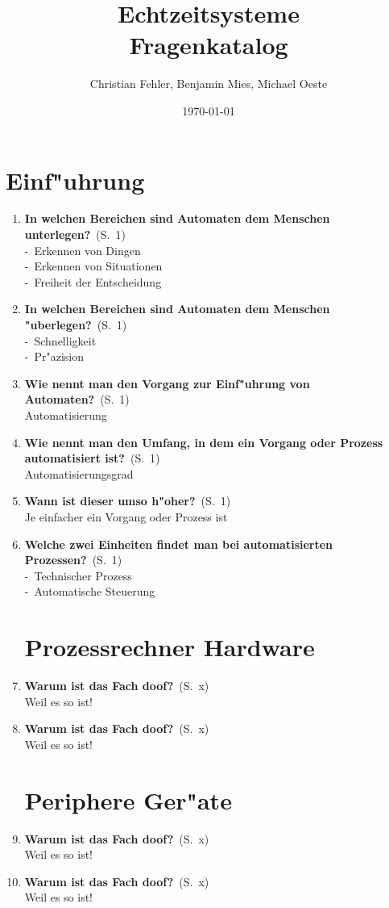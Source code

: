 \documentclass[a4paper,latin1,12pt]{article}
\title{{\Huge Echtzeitsysteme}\\Fragenkatalog}
\author{{\Large Christian Fehler, Benjamin Mies, Michael Oeste}}
\date{\small\today}
\newcommand{\question}[3]{\item {\textbf{#1?}}\ (S.\ #2)\\[2mm]#3}
\newcommand{\catchword}[1]{-\ #1\\}
\newcommand{\normaltext}[1]{#1\\}
\begin{document}
\maketitle
\newpage
\tableofcontents

\newpage
\section{Einf"uhrung}

\begin{enumerate}

  \question{In welchen Bereichen sind Automaten dem Menschen unterlegen}{1}
  {
    \catchword{Erkennen von Dingen}
    \catchword{Erkennen von Situationen}
    \catchword{Freiheit der Entscheidung}
  }

  \question{In welchen Bereichen sind Automaten dem Menschen "uberlegen}{1}
  {
    \catchword{Schnelligkeit}
    \catchword{Pr"azision}
  }

  \question{Wie nennt man den Vorgang zur Einf"uhrung von Automaten}{1}
  {
   \normaltext{Automatisierung}
  }

  \question{Wie nennt man den Umfang, in dem ein Vorgang oder Prozess automatisiert ist}{1}
  {
    \normaltext{Automatisierungsgrad}
  }

  \question{Wann ist dieser umso h"oher}{1}
  {
    \normaltext{Je einfacher ein Vorgang oder Prozess ist}
  }

  \question{Welche zwei Einheiten findet man bei automatisierten Prozessen}{1}
  {
    \catchword{Technischer Prozess}
    \catchword{Automatische Steuerung}
  }

  \newpage
  \section{Prozessrechner Hardware}

  \question{Warum ist das Fach doof}{x}
  {
    \normaltext{Weil es so ist!}
  }

  \question{Warum ist das Fach doof}{x}
  {
    \normaltext{Weil es so ist!}
  }

  \newpage
  \section{Periphere Ger"ate}

  \question{Warum ist das Fach doof}{x}
  {
    \normaltext{Weil es so ist!}
  }

  \question{Warum ist das Fach doof}{x}
  {
    \normaltext{Weil es so ist!}
  }


\end{enumerate}
\end{document}
